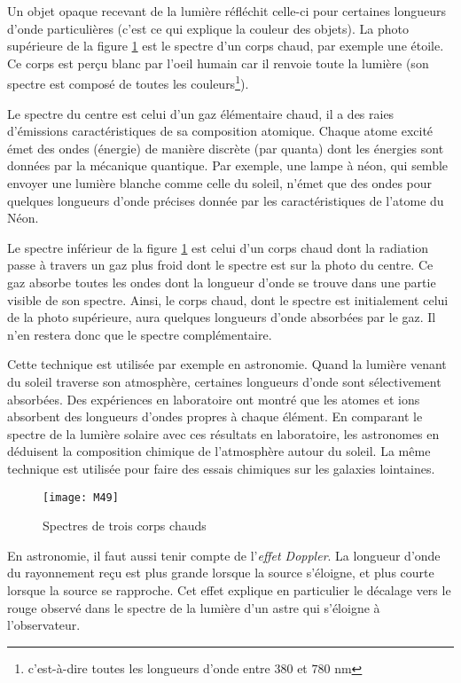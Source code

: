 \noindent Un objet opaque recevant de la lumière réfléchit celle-ci pour certaines longueurs d'onde particulières (c'est ce qui explique la couleur des objets). La photo supérieure de la figure \ref{d15} est le spectre d'un corps chaud, par exemple une étoile. Ce corps est perçu blanc par l'oeil humain car il renvoie toute la lumière (son spectre est composé de toutes les couleurs\footnote{c'est-à-dire toutes les longueurs d'onde entre $380$ et $780$ nm}).

\noindent Le spectre du centre est celui d'un gaz élémentaire chaud, il a des raies d'émissions caractéristiques de sa composition atomique. Chaque atome excité émet des ondes (énergie) de manière discrète (par quanta) dont les énergies sont données par la mécanique quantique. Par exemple, une lampe à néon, qui semble envoyer une lumière blanche comme celle du soleil, n'émet que des ondes pour quelques longueurs d'onde précises donnée par les caractéristiques de l'atome du Néon.

\noindent Le spectre inférieur de la figure \ref{d15} est celui d'un corps chaud dont la radiation passe à travers un gaz plus froid dont le spectre est sur la photo du centre. Ce gaz absorbe toutes les ondes dont la longueur d'onde se trouve dans une partie visible de son spectre. Ainsi, le corps chaud, dont le spectre est initialement celui de la photo supérieure, aura quelques longueurs d'onde absorbées par le gaz. Il n'en restera donc que le spectre complémentaire.

\noindent Cette technique est utilisée par exemple en astronomie. Quand la lumière venant du soleil traverse son atmosphère, certaines longueurs d'onde sont sélectivement absorbées. Des expériences en laboratoire ont montré que les atomes et ions absorbent des longueurs d'ondes propres à chaque élément. En comparant le spectre de la lumière solaire avec ces résultats en laboratoire, les astronomes en déduisent la composition chimique de l'atmosphère autour du soleil. La même technique est utilisée pour faire des essais chimiques sur les galaxies lointaines.

\begin{figure}[h!]
    \centering
    \texttt{[image: M49]}
    \caption{Spectres de trois corps chauds}
    \label{d15}
\end{figure}

\noindent En astronomie, il faut aussi tenir compte de l'\textit{effet Doppler}. La longueur d'onde du rayonnement reçu est plus grande lorsque la source s'éloigne, et plus courte lorsque la source se rapproche.
Cet effet explique en particulier le décalage vers le rouge observé dans le spectre de la lumière d'un astre qui s'éloigne à l'observateur.

